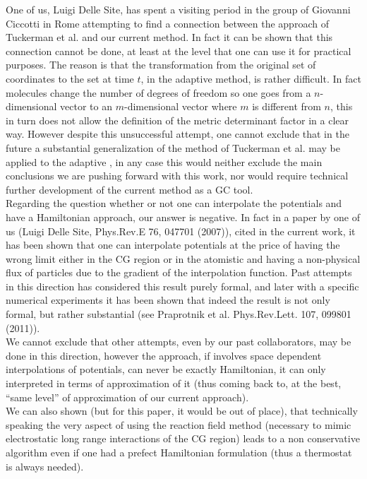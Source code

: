 \documentclass[12pt]{article}
\begin{document}
One of us, Luigi Delle Site, has spent a visiting period in the group of Giovanni Ciccotti in Rome attempting to find a connection between the approach of
 Tuckerman et al. and our current method. In fact it can be shown that this connection cannot be done, at least at the level that one can use it for practical purposes. The reason is that the transformation from the original set of coordinates to the set at time $t$, in the adaptive method, is rather difficult. In fact molecules change the number of degrees of freedom so one goes from a $n$-dimensional vector to an $m$-dimensional vector where $m$ is different from $n$, this in turn does not allow the definition of the metric determinant factor in a clear way. However despite this unsuccessful attempt, one cannot exclude that in the future a substantial generalization of the method of Tuckerman et al. may be applied to the adaptive , in any case this would neither exclude the main conclusions we are pushing forward with this work, nor would require technical further development of the current method as a GC tool.\\
Regarding the question whether or not one can interpolate the potentials and have a Hamiltonian approach, our answer is negative. In fact in a paper by one of us (Luigi Delle Site, Phys.Rev.E 76, 047701 (2007)), cited in the current work, it has been shown that one can interpolate potentials at the price of having the wrong limit either in the CG region or in the atomistic and having a non-physical flux of particles due to the gradient of the interpolation function. Past attempts in this direction has considered this result purely formal, and later with a specific numerical experiments it has been shown that indeed the result is not only formal, but rather substantial (see Praprotnik et al. Phys.Rev.Lett. 107, 099801 (2011)).\\
We cannot exclude that other attempts, even by our past collaborators, may be done in this direction, however the approach, if involves space dependent interpolations of potentials, can never be exactly Hamiltonian, it can only interpreted in terms of approximation of it (thus coming back to, at the best, ``same level'' of approximation of our current approach).\\
We can also shown (but for this paper, it would be out of place), that technically speaking the very aspect of using the reaction field method (necessary to mimic electrostatic long range interactions of the CG region) leads to a non conservative algorithm even if one had a prefect Hamiltonian formulation (thus a thermostat is always needed).\\
\end{document}
